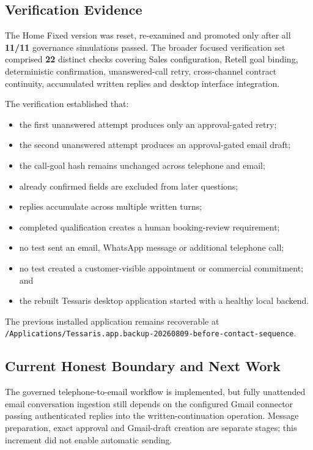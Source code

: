 \subsection{Verification Evidence}

The Home Fixed version was reset, re-examined and promoted only after all
\textbf{11/11} governance simulations passed.  The broader focused verification
set comprised \textbf{22} distinct checks covering Sales configuration,
Retell goal binding, deterministic confirmation, unanswered-call retry,
cross-channel contract continuity, accumulated written replies and desktop
interface integration.

The verification established that:

\begin{itemize}[leftmargin=*]
  \item the first unanswered attempt produces only an approval-gated retry;
  \item the second unanswered attempt produces an approval-gated email draft;
  \item the call-goal hash remains unchanged across telephone and email;
  \item already confirmed fields are excluded from later questions;
  \item replies accumulate across multiple written turns;
  \item completed qualification creates a human booking-review requirement;
  \item no test sent an email, WhatsApp message or additional telephone call;
  \item no test created a customer-visible appointment or commercial commitment; and
  \item the rebuilt Tessaris desktop application started with a healthy local backend.
\end{itemize}

The previous installed application remains recoverable at
\texttt{/Applications/Tessaris.app.backup-20260809-before-contact-sequence}.

\subsection{Current Honest Boundary and Next Work}

The governed telephone-to-email workflow is implemented, but fully unattended
email conversation ingestion still depends on the configured Gmail connector
passing authenticated replies into the written-continuation operation.  Message
preparation, exact approval and Gmail-draft creation are separate stages; this
increment did not enable automatic sending.

